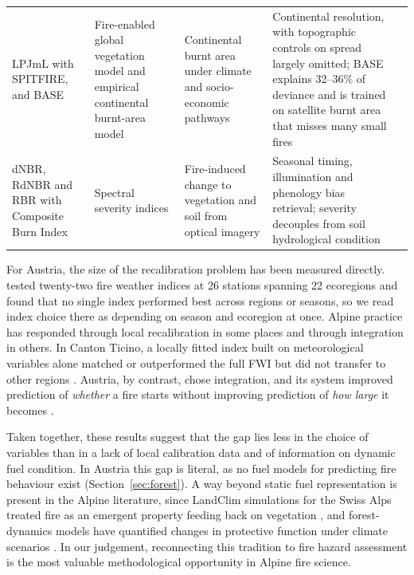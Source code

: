 \documentclass[11pt,a4paper]{article}
\begin{document}
{\begin{xltabular}{\textwidth}{@{}>{\raggedright\arraybackslash}p{2.35cm} >{\raggedright\arraybackslash}p{2.1cm} >{\raggedright\arraybackslash}X >{\raggedright\arraybackslash}X >{\raggedright\arraybackslash}p{2.5cm}@{}}
LPJmL with SPITFIRE, and BASE & Fire-enabled global vegetation model and empirical continental burnt-area model & Continental burnt area under climate and socio-economic pathways & Continental resolution, with topographic controls on spread largely omitted; BASE explains 32--36\% of deviance and is trained on satellite burnt area that misses many small fires & \citealp{jones_global_2022, billing_future_2026, forrest_understanding_2024} \\
dNBR, RdNBR and RBR with Composite Burn Index & Spectral severity indices & Fire-induced change to vegetation and soil from optical imagery & Seasonal timing, illumination and phenology bias retrieval; severity decouples from soil hydrological condition & \citealp{morresi_mapping_2022, negri_wildfire_2026} \\
\end{xltabular}
}

For Austria, the size of the recalibration problem has been measured directly. \citet{arpaci_selecting_2013} tested twenty-two fire weather indices at 26 stations spanning 22 ecoregions and found that no single index performed best across regions or seasons, so we read index choice there as depending on season and ecoregion at once. Alpine practice has responded through local recalibration in some places and through integration in others. In Canton Ticino, a locally fitted index built on meteorological variables alone matched or outperformed the full FWI but did not transfer to other regions \citep{de_angelis_modelling_2015}. Austria, by contrast, chose integration, and its system improved prediction of \emph{whether} a fire starts without improving prediction of \emph{how large} it becomes \citep{muller_towards_2020}.

Taken together, these results suggest that the gap lies less in the choice of variables than in a lack of local calibration data and of information on dynamic fuel condition. In Austria this gap is literal, as no fuel models for predicting fire behaviour exist \citep{neumann_fuel_2022} (Section~\ref{sec:forest}). A way beyond static fuel representation is present in the Alpine literature, since LandClim simulations for the Swiss Alps treated fire as an emergent property feeding back on vegetation \citep{schumacher_relative_2006, colombaroli_species_2010}, and forest-dynamics models have quantified changes in protective function under climate scenarios \citep{hillebrand_contrasting_2023, moos_climate_2021}. In our judgement, reconnecting this tradition to fire hazard assessment is the most valuable methodological opportunity in Alpine fire science.
\end{document}
